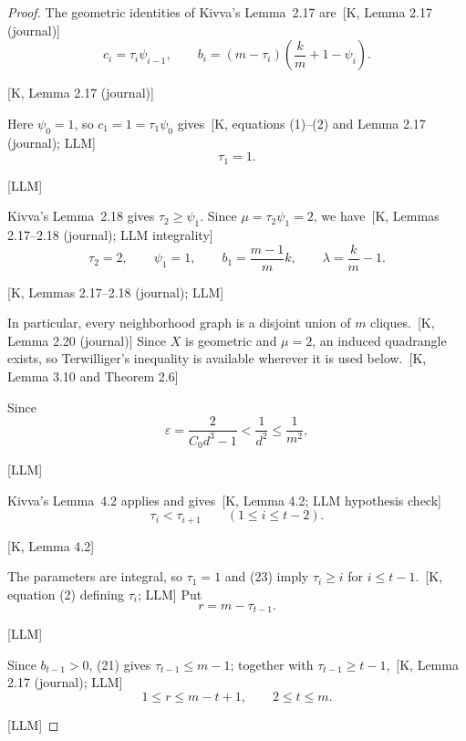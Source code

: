 \documentclass[10pt]{amsart}
\theoremstyle{remark}
\newcommand{\eps}{\varepsilon}
\newcommand{\prov}[1]{\unskip\, {\normalfont\scriptsize\color{provgray}\textsf{[#1]}}}
\newcommand{\eqprov}[1]{%
  \par\nobreak\vspace{-0.68\baselineskip}%
  \noindent\hfill{\normalfont\scriptsize\color{provgray}\textsf{[#1]}}%
  \par\vspace{0.20\baselineskip}%
}
\begin{document}
\begin{proof}
The geometric identities of Kivva's Lemma~2.17 are\prov{K, Lemma 2.17 (journal)}
\begin{equation}
c_i=\tau_i\psi_{i-1},
\qquad
b_i=(m-\tau_i)\left(\frac{k}{m}+1-\psi_i\right).
\end{equation}
\eqprov{K, Lemma 2.17 (journal)}
Here $\psi_0=1$, so $c_1=1=\tau_1\psi_0$ gives\prov{K, equations (1)--(2) and Lemma 2.17 (journal); LLM}
\[
\tau_1=1.
\]
\eqprov{LLM}
Kivva's Lemma~2.18 gives $\tau_2\ge\psi_1$. Since $\mu=\tau_2\psi_1=2$, we have\prov{K, Lemmas 2.17--2.18 (journal); LLM integrality}
\begin{equation}
\tau_2=2,\qquad \psi_1=1,\qquad b_1=\frac{m-1}{m}k,
\qquad \lambda=\frac{k}{m}-1.
\end{equation}
\eqprov{K, Lemmas 2.17--2.18 (journal); LLM}
In particular, every neighborhood graph is a disjoint union of $m$ cliques.\prov{K, Lemma 2.20 (journal)} Since $X$ is geometric and $\mu=2$, an induced quadrangle exists, so Terwilliger's inequality is available wherever it is used below.\prov{K, Lemma 3.10 and Theorem 2.6}

Since
\[
\eps=\frac{2}{C_0d^3-1}<\frac1{d^2}\le\frac1{m^2},
\]
\eqprov{LLM}
Kivva's Lemma~4.2 applies and gives\prov{K, Lemma 4.2; LLM hypothesis check}
\begin{equation}
\tau_i<\tau_{i+1}\qquad(1\le i\le t-2).
\end{equation}
\eqprov{K, Lemma 4.2}
The parameters are integral, so $\tau_1=1$ and (23) imply $\tau_i\ge i$ for $i\le t-1$.\prov{K, equation (2) defining $\tau_i$; LLM} Put
\begin{equation}
r=m-\tau_{t-1}.
\end{equation}
\eqprov{LLM}
Since $b_{t-1}>0$, (21) gives $\tau_{t-1}\le m-1$; together with $\tau_{t-1}\ge t-1$,\prov{K, Lemma 2.17 (journal); LLM}
\begin{equation}
1\le r\le m-t+1,\qquad 2\le t\le m.
\end{equation}
\eqprov{LLM}


\end{proof}
\end{document}
